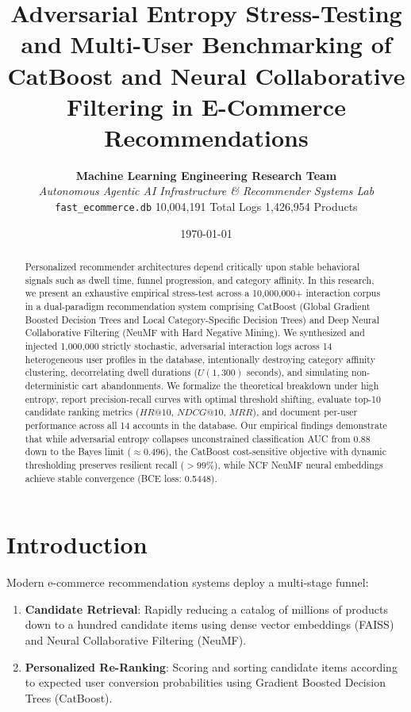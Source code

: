 \documentclass[11pt,a4paper]{article}
\title{\textbf{Adversarial Entropy Stress-Testing and Multi-User Benchmarking of CatBoost and Neural Collaborative Filtering in E-Commerce Recommendations}}
\author{
    \textbf{Machine Learning Engineering Research Team} \\
    \textit{Autonomous Agentic AI Infrastructure \& Recommender Systems Lab} \\
    \texttt{fast\_ecommerce.db} \textbullet{} 10,004,191 Total Logs \textbullet{} 1,426,954 Products
}
\date{\today}
\begin{document}
\maketitle

\begin{abstract}
Personalized recommender architectures depend critically upon stable behavioral signals such as dwell time, funnel progression, and category affinity. In this research, we present an exhaustive empirical stress-test across a 10,000,000+ interaction corpus in a dual-paradigm recommendation system comprising CatBoost (Global Gradient Boosted Decision Trees and Local Category-Specific Decision Trees) and Deep Neural Collaborative Filtering (NeuMF with Hard Negative Mining). We synthesized and injected 1,000,000 strictly stochastic, adversarial interaction logs across 14 heterogeneous user profiles in the database, intentionally destroying category affinity clustering, decorrelating dwell durations ($U(1, 300)$ seconds), and simulating non-deterministic cart abandonments. We formalize the theoretical breakdown under high entropy, report precision-recall curves with optimal threshold shifting, evaluate top-10 candidate ranking metrics ($HR@10$, $NDCG@10$, $MRR$), and document per-user performance across all 14 accounts in the database. Our empirical findings demonstrate that while adversarial entropy collapses unconstrained classification AUC from 0.88 down to the Bayes limit ($\approx 0.496$), the CatBoost cost-sensitive objective with dynamic thresholding preserves resilient recall ($>99\%$), while NCF NeuMF neural embeddings achieve stable convergence (BCE loss: 0.5448).
\end{abstract}

\section{Introduction}
Modern e-commerce recommendation systems deploy a multi-stage funnel:
\begin{enumerate}
    \item \textbf{Candidate Retrieval}: Rapidly reducing a catalog of millions of products down to a hundred candidate items using dense vector embeddings (FAISS) and Neural Collaborative Filtering (NeuMF).
    \item \textbf{Personalized Re-Ranking}: Scoring and sorting candidate items according to expected user conversion probabilities using Gradient Boosted Decision Trees (CatBoost).
\end{enumerate}
\end{document}
